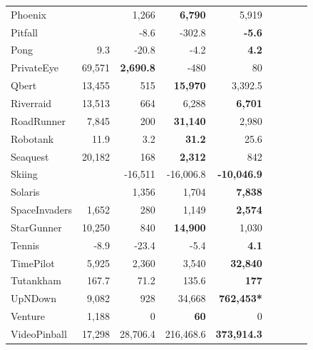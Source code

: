 {\begin{tabular}{lrrrrrrrl}
Phoenix          & \multicolumn{1}{l}{} & 1,266          & \textbf{6,790}  & 5,919              \\
Pitfall          & \multicolumn{1}{l}{} & -8.6             & -302.8            & \textbf{-5.6}        \\
Pong             & 9.3                     & -20.8            & -4.2              & \textbf{4.2}         \\
PrivateEye       & 69,571               & \textbf{2,690.8} & -480            & 80                 \\
Qbert            & 13,455               & 515            & \textbf{15,970} & 3,392.5              \\
Riverraid        & 13,513               & 664            & 6,288           & \textbf{6,701}     \\
RoadRunner       & 7,845                & 200            & \textbf{31,140} & 2,980              \\
Robotank         & 11.9                    & 3.2              & \textbf{31.2}     & 25.6                 \\
Seaquest         & 20,182               & 168            & \textbf{2,312}  & 842                \\
Skiing           & \multicolumn{1}{l}{} & -16,511        & -16,006.8         & \textbf{-10,046.9}   \\
Solaris          & \multicolumn{1}{l}{} & 1,356          & 1,704           & \textbf{7,838}     \\
SpaceInvaders    & 1,652                & 280            & 1,149           & \textbf{2,574}     \\
StarGunner       & 10,250               & 840            & \textbf{14,900} & 1,030              \\
Tennis           & -8.9                    & -23.4            & -5.4              & \textbf{4.1}         \\
TimePilot        & 5,925                & 2,360          & 3,540           & \textbf{32,840}    \\
Tutankham        & 167.7                   & 71.2             & 135.6             & \textbf{177}       \\
UpNDown          & 9,082                & 928            & 34,668          & \textbf{762,453*}   \\
Venture          & 1,188                & 0              & \textbf{60}     & 0                  \\
VideoPinball     & 17,298               & 28,706.4         & 216,468.6         & \textbf{373,914.3}   \\

\end{tabular}}
